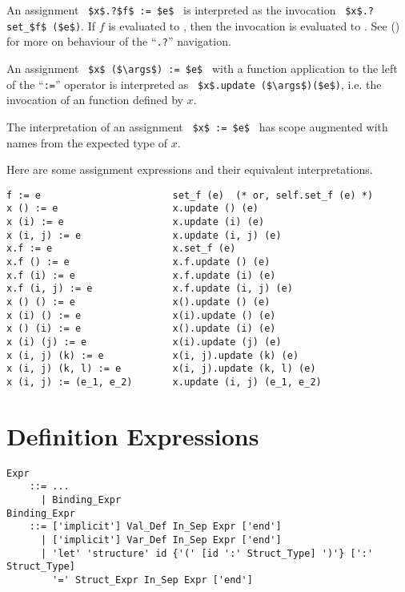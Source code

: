 An assignment ~\lstinline!$x$.?$f$ := $e$!~ is interpreted as the invocation ~\lstinline!$x$.?set_$f$ ($e$)!. If $f$ is evaluated to , then the invocation is evaluated to . See () for more on behaviour of the ``\lstinline!.?!'' navigation. 

An assignment ~\lstinline!$x$ ($\args$) := $e$!~ with a function application to the left of the ``\lstinline!:=!'' operator is interpreted as ~\lstinline!$x$.update ($\args$)($e$)!, i.e. the invocation of an  function defined by $x$.  

The interpretation of an assignment ~\lstinline!$x$ := $e$!~ has scope augmented with names from the expected type of $x$.

\example Here are some assignment expressions and their equivalent interpretations.
\begin{lstlisting}
f := e                       set_f (e)  (* or, self.set_f (e) *)
x () := e                    x.update () (e)
x (i) := e                   x.update (i) (e)
x (i, j) := e                x.update (i, j) (e)
x.f := e                     x.set_f (e)
x.f () := e                  x.f.update () (e)
x.f (i) := e                 x.f.update (i) (e)
x.f (i, j) := e              x.f.update (i, j) (e)
x () () := e                 x().update () (e)
x (i) () := e                x(i).update () (e)
x () (i) := e                x().update (i) (e)
x (i) (j) := e               x(i).update (j) (e)
x (i, j) (k) := e            x(i, j).update (k) (e)
x (i, j) (k, l) := e         x(i, j).update (k, l) (e)
x (i, j) := (e_1, e_2)       x.update (i, j) (e_1, e_2)
\end{lstlisting}





\section{Definition Expressions}
\label{sec:def-expressions}

\grammar\begin{lstlisting}
Expr 
    ::= ...
      | Binding_Expr
Binding_Expr 
    ::= ['implicit'] Val_Def In_Sep Expr ['end']
      | ['implicit'] Var_Def In_Sep Expr ['end']
      | 'let' 'structure' id {'(' [id ':' Struct_Type] ')'} [':' Struct_Type]
        '=' Struct_Expr In_Sep Expr ['end']
\end{lstlisting}





